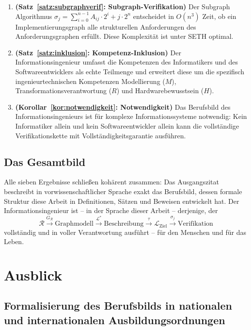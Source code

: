 ﻿\documentclass[a4paper,12pt]{article}
\theoremstyle{definition}
\begin{document}
\begin{enumerate}
  \item \textbf{(Satz~\ref{satz:subgraphverif}: Subgraph-Verifikation)}
        Der Subgraph Algorithmus
        $\sigma_j = \sum_{i=0}^{n-1} A_{ij} \cdot 2^i + j \cdot 2^n$
        entscheidet in $O(n^3)$ Zeit, ob ein Implementierungsgraph alle strukturellen
        Anforderungen des Anforderungsgraphen erfüllt. Diese Komplexität ist unter SETH
        optimal.

  \item \textbf{(Satz~\ref{satz:inklusion}: Kompetenz-Inklusion)}
        Der Informationsingenieur umfasst die Kompetenzen des Informatikers und des
        Softwareentwicklers als echte Teilmenge und erweitert diese um die spezifisch
        ingenieurtechnischen Kompetenzen Modellierung ($M$), Transformationsverantwortung
        ($R$) und Hardwarebewusstsein ($H$).

  \item \textbf{(Korollar~\ref{kor:notwendigkeit}: Notwendigkeit)}
        Das Berufsbild des Informationsingenieurs ist für komplexe Informationssysteme
        notwendig: Kein Informatiker allein und kein Softwareentwickler allein kann
        die vollständige Verifikationskette mit Vollständigkeitsgarantie ausführen.
\end{enumerate}

\subsection{Das Gesamtbild}

Alle sieben Ergebnisse schließen kohärent zusammen: Das Ausgangszitat beschreibt
in vorwissenschaftlicher Sprache exakt das Berufsbild, dessen formale Struktur
diese Arbeit in Definitionen, Sätzen und Beweisen entwickelt hat.
Der Informationsingenieur ist -- in der Sprache dieser Arbeit -- derjenige, der
\[
  \mathcal{R}
  \xrightarrow{G_\mathcal{R}} \text{Graphmodell}
  \xrightarrow{\mathcal{L}^*} \text{Beschreibung}
  \xrightarrow{\tau} \mathcal{L}_{\text{Ziel}}
  \xrightarrow{\sigma_j} \text{Verifikation}
\]
vollständig und in voller Verantwortung ausführt -- für den Menschen und für das Leben.

\section{Ausblick}
\label{sec:ausblick}

\subsection{Formalisierung des Berufsbilds in nationalen und internationalen Ausbildungsordnungen}
\end{document}
